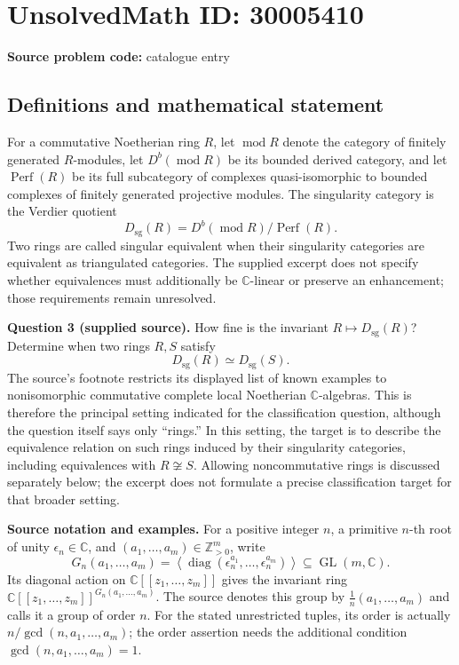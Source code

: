 \documentclass[11pt]{article}
\newcommand{\Z}{\mathbb{Z}}
\newcommand{\C}{\mathbb{C}}
\begin{document}
\section*{UnsolvedMath ID: 30005410}
\textbf{Source problem code:} catalogue entry
\subsection{Definitions and mathematical statement}
For a commutative Noetherian ring \(R\), let \(\operatorname{mod}R\) denote the category of finitely generated \(R\)-modules, let \(D^b(\operatorname{mod}R)\) be its bounded derived category, and let \(\operatorname{Perf}(R)\) be its full subcategory of complexes quasi-isomorphic to bounded complexes of finitely generated projective modules. The singularity category is the Verdier quotient
\[
D_{\mathrm{sg}}(R)=D^b(\operatorname{mod}R)/\operatorname{Perf}(R).
\]
Two rings are called singular equivalent when their singularity categories are equivalent as triangulated categories. The supplied excerpt does not specify whether equivalences must additionally be \(\C\)-linear or preserve an enhancement; those requirements remain unresolved.

\textbf{Question 3 (supplied source).} How fine is the invariant \(R\mapsto D_{\mathrm{sg}}(R)\)? Determine when two rings \(R,S\) satisfy
\[
D_{\mathrm{sg}}(R)\simeq D_{\mathrm{sg}}(S).
\]
The source's footnote restricts its displayed list of known examples to nonisomorphic commutative complete local Noetherian \(\C\)-algebras. This is therefore the principal setting indicated for the classification question, although the question itself says only ``rings.'' In this setting, the target is to describe the equivalence relation on such rings induced by their singularity categories, including equivalences with \(R\not\cong S\). Allowing noncommutative rings is discussed separately below; the excerpt does not formulate a precise classification target for that broader setting.

\textbf{Source notation and examples.} For a positive integer \(n\), a primitive \(n\)-th root of unity \(\epsilon_n\in\C\), and \((a_1,\ldots,a_m)\in\Z_{>0}^m\), write
\[
G_n(a_1,\ldots,a_m)=\left\langle\operatorname{diag}(\epsilon_n^{a_1},\ldots,\epsilon_n^{a_m})\right\rangle\subseteq\operatorname{GL}(m,\C).
\]
Its diagonal action on \(\C[[z_1,\ldots,z_m]]\) gives the invariant ring \(\C[[z_1,\ldots,z_m]]^{G_n(a_1,\ldots,a_m)}\). The source denotes this group by \(\frac1n(a_1,\ldots,a_m)\) and calls it a group of order \(n\). For the stated unrestricted tuples, its order is actually \(n/\gcd(n,a_1,\ldots,a_m)\); the order assertion needs the additional condition \(\gcd(n,a_1,\ldots,a_m)=1\).
\end{document}
